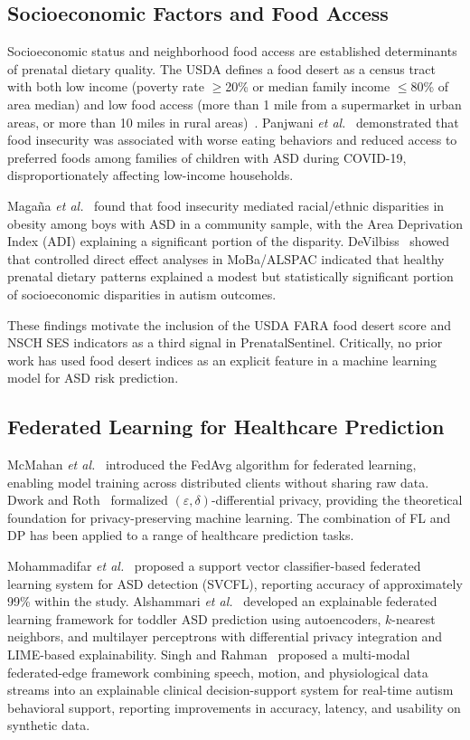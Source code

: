 \documentclass[journal]{IEEEtran}
\newcommand{\etal}{\textit{et al.}}
\newcommand{\eps}{\varepsilon}
\begin{document}
\subsection{Socioeconomic Factors and Food Access}

Socioeconomic status and neighborhood food access are established
determinants of prenatal dietary quality. The USDA defines a food
desert as a census tract with both low income (poverty rate $\geq$20\%
or median family income $\leq$80\% of area median) and low food access
(more than 1 mile from a supermarket in urban areas, or more than 10
miles in rural areas)~\cite{usdafara2019}. Panjwani \etal~\cite{panjwani2021food}
demonstrated that food insecurity was associated with worse eating
behaviors and reduced access to preferred foods among families of
children with ASD during COVID-19, disproportionately affecting
low-income households.

Maga\~{n}a \etal~\cite{magana2023racial} found that food insecurity
mediated racial/ethnic disparities in obesity among boys with ASD in
a community sample, with the Area Deprivation Index (ADI) explaining
a significant portion of the disparity. DeVilbiss~\cite{devilbiss2017prenatal}
showed that controlled direct effect analyses in MoBa/ALSPAC indicated
that healthy prenatal dietary patterns explained a modest but
statistically significant portion of socioeconomic disparities in
autism outcomes.

These findings motivate the inclusion of the USDA FARA food desert
score and NSCH SES indicators as a third signal in PrenatalSentinel.
Critically, no prior work has used food desert indices as an explicit
feature in a machine learning model for ASD risk prediction.

\subsection{Federated Learning for Healthcare Prediction}

McMahan \etal~\cite{mcmahan2017communication} introduced the FedAvg
algorithm for federated learning, enabling model training across
distributed clients without sharing raw data. Dwork and
Roth~\cite{dwork2014algorithmic} formalized $(\eps,\delta)$-differential
privacy, providing the theoretical foundation for privacy-preserving
machine learning. The combination of FL and DP has been applied to
a range of healthcare prediction tasks.

Mohammadifar \etal~\cite{mohammadifar2023federated} proposed a
support vector classifier-based federated learning system for ASD
detection (SVCFL), reporting accuracy of approximately 99\% within
the study. Alshammari \etal~\cite{alshammari2024explainable}
developed an explainable federated learning framework for toddler
ASD prediction using autoencoders, $k$-nearest neighbors, and
multilayer perceptrons with differential privacy integration and
LIME-based explainability. Singh and Rahman~\cite{singh2025responsible}
proposed a multi-modal federated-edge framework combining speech,
motion, and physiological data streams into an explainable clinical
decision-support system for real-time autism behavioral support,
reporting improvements in accuracy, latency, and usability on
synthetic data.
\end{document}
